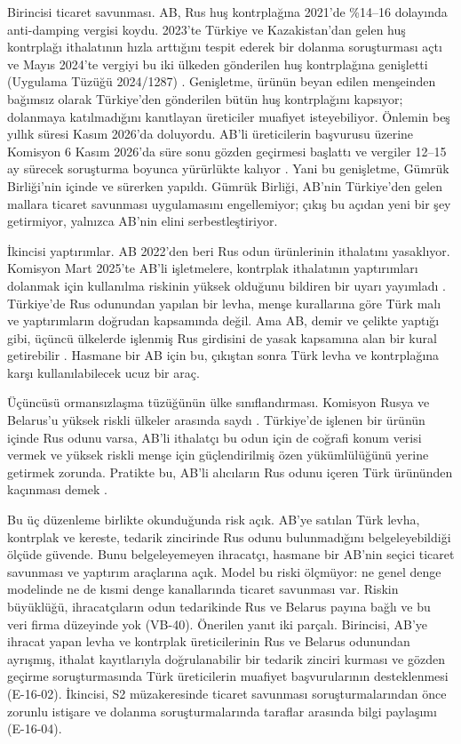 Birincisi ticaret savunması. AB, Rus huş kontrplağına 2021'de \%14--16 dolayında anti-damping vergisi koydu. 2023'te Türkiye ve Kazakistan'dan gelen huş kontrplağı ithalatının hızla arttığını tespit ederek bir dolanma soruşturması açtı ve Mayıs 2024'te vergiyi bu iki ülkeden gönderilen huş kontrplağına genişletti (Uygulama Tüzüğü 2024/1287) \etiketV{}. Genişletme, ürünün beyan edilen menşeinden bağımsız olarak Türkiye'den gönderilen bütün huş kontrplağını kapsıyor; dolanmaya katılmadığını kanıtlayan üreticiler muafiyet isteyebiliyor. Önlemin beş yıllık süresi Kasım 2026'da doluyordu. AB'li üreticilerin başvurusu üzerine Komisyon 6 Kasım 2026'da süre sonu gözden geçirmesi başlattı ve vergiler 12--15 ay sürecek soruşturma boyunca yürürlükte kalıyor \etiketV{}. Yani bu genişletme, Gümrük Birliği'nin içinde ve sürerken yapıldı. Gümrük Birliği, AB'nin Türkiye'den gelen mallara ticaret savunması uygulamasını engellemiyor; çıkış bu açıdan yeni bir şey getirmiyor, yalnızca AB'nin elini serbestleştiriyor.

İkincisi yaptırımlar. AB 2022'den beri Rus odun ürünlerinin ithalatını yasaklıyor. Komisyon Mart 2025'te AB'li işletmelere, kontrplak ithalatının yaptırımları dolanmak için kullanılma riskinin yüksek olduğunu bildiren bir uyarı yayımladı \etiketV{}. Türkiye'de Rus odunundan yapılan bir levha, menşe kurallarına göre Türk malı ve yaptırımların doğrudan kapsamında değil. Ama AB, demir ve çelikte yaptığı gibi, üçüncü ülkelerde işlenmiş Rus girdisini de yasak kapsamına alan bir kural getirebilir \etiketH{}. Hasmane bir AB için bu, çıkıştan sonra Türk levha ve kontrplağına karşı kullanılabilecek ucuz bir araç.

Üçüncüsü ormansızlaşma tüzüğünün ülke sınıflandırması. Komisyon Rusya ve Belarus'u yüksek riskli ülkeler arasında saydı \etiketV{}. Türkiye'de işlenen bir ürünün içinde Rus odunu varsa, AB'li ithalatçı bu odun için de coğrafi konum verisi vermek ve yüksek riskli menşe için güçlendirilmiş özen yükümlülüğünü yerine getirmek zorunda. Pratikte bu, AB'li alıcıların Rus odunu içeren Türk ürününden kaçınması demek \etiketH{}.

Bu üç düzenleme birlikte okunduğunda risk açık. AB'ye satılan Türk levha, kontrplak ve kereste, tedarik zincirinde Rus odunu bulunmadığını belgeleyebildiği ölçüde güvende. Bunu belgeleyemeyen ihracatçı, hasmane bir AB'nin seçici ticaret savunması ve yaptırım araçlarına açık. Model bu riski ölçmüyor: ne genel denge modelinde ne de kısmi denge kanallarında ticaret savunması var. Riskin büyüklüğü, ihracatçıların odun tedarikinde Rus ve Belarus payına bağlı ve bu veri firma düzeyinde yok (VB-40). Önerilen yanıt iki parçalı. Birincisi, AB'ye ihracat yapan levha ve kontrplak üreticilerinin Rus ve Belarus odunundan ayrışmış, ithalat kayıtlarıyla doğrulanabilir bir tedarik zinciri kurması ve gözden geçirme soruşturmasında Türk üreticilerin muafiyet başvurularının desteklenmesi (E-16-02). İkincisi, S2 müzakeresinde ticaret savunması soruşturmalarından önce zorunlu istişare ve dolanma soruşturmalarında taraflar arasında bilgi paylaşımı (E-16-04).

